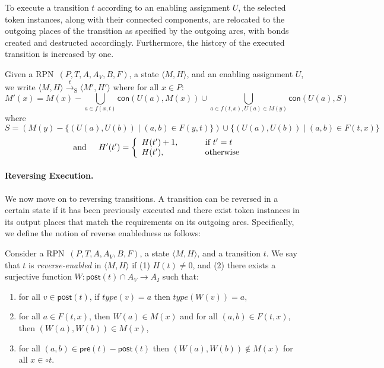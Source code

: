 \documentclass[runningheads]{llncs}
\newcommand{\trans}[1]{\stackrel{#1}{\rightarrow}_{\mathrm{S}}}
\newcommand{\guard}[1]{\mathsf{pre}(#1)}
\newcommand{\effects}[1]{\mathsf{post}(#1)}
\newcommand{\connected}{\mathsf{con}}
\newcommand{\state}[2]{\langle {#1}, {#2}\rangle}
\newcommand{\RPN}{\textsc{RPN\ }}
\newcommand{\type}{\mathit{type}}
\begin{document}
To execute a transition $t$ according to an enabling assignment $U$, 
the selected token instances, along with their connected components,
are relocated to the outgoing places of the transition as specified
by the outgoing arcs, with bonds created and destructed accordingly. 
Furthermore,
the history of the executed transition is increased by one.
\begin{definition}{\rm \label{forward}
		Given a \RPN $(P,T,  A, A_V, B, F)$, a state $\langle M, H\rangle$, and an
		enabling assignment $U$, we write $\state{M}{H}
		\trans{t} \state{M'}{H'}$
		where for all $x\in P$:
		\[
		M'(x) =   M(x)- \bigcup_{a\in f(x,t)} \connected(U(a), M(x)) 
		\cup  \bigcup_{a\in f(t,x),U(a)\in M(y)} \connected(U(a),S)\]
		where $S= (M(y)
		-\{(U(a),U(b))\mid (a,b)\in F(y,t)\})\cup \{ (U(a),U(b))\mid (a,b)\in F(t,x) \}$
		\[
		\hspace{0.2in}\mbox{and}\hspace{0.2in}
		H'(t') = \left\{
		\begin{array}{ll}
		H(t')+1, \hspace{1cm} \textrm{ if } t' = t  \; \\
		H(t'), \hspace{1.5cm}  \;\textrm{ otherwise }
		\end{array}
		\right.			\]	
}\end{definition} 


\paragraph{Reversing Execution.}
We now move on to  reversing transitions. 
A transition can be reversed in a certain state if it has been previously executed and 
there exist token instances in its output places 
that match the requirements on its outgoing arcs. Specifically, we define the notion of reverse 
enabledness as follows:
\begin{definition}\label{renabled}{\rm
		Consider a \RPN $(P,T, A, A_V, B, F)$, a state $\state{M}{H}$, and a transition $t$.
		We say that $t$ is \emph{reverse-enabled} in $\state{M}{H}$ if (1)  $H(t)\neq 0$, and (2)
		there exists a surjective function 
		$W:\effects{t}\cap A_V\rightarrow  A_I$ such that:
		\begin{enumerate}
			\item  for all
			$v\in\effects{t}$, if $\type(v) = a$
			then $\type(W(v))=a$, 
			\item for all $a\in F(t,x)$, then $W(a)\in M(x)$ and for all $(a,b)\in F(t,x)$, then $(W(a),W(b))\in M(x)$, 
			\item  for all $(a,b)\in \guard{t} - \effects{t}$ then $(W(a),W(b))\not\in M(x)$ for all $x\in\circ t$.
		\end{enumerate}
}\end{definition}
\end{document}
